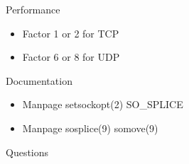 \documentclass[14pt]{beamer}
\begin{document}
\begin{frame}{Performance}
\begin{itemize}
    \item Factor 1 or 2 for TCP
    \item Factor 6 or 8 for UDP
\end{itemize}
\end{frame}

\begin{frame}{Documentation}
\begin{itemize}
    \item Manpage setsockopt(2) SO\_SPLICE
    \item Manpage sosplice(9) somove(9)
\end{itemize}
\end{frame}

\begin{frame}{Questions}
\begin{center}
\end{center}
\end{frame}
\end{document}

